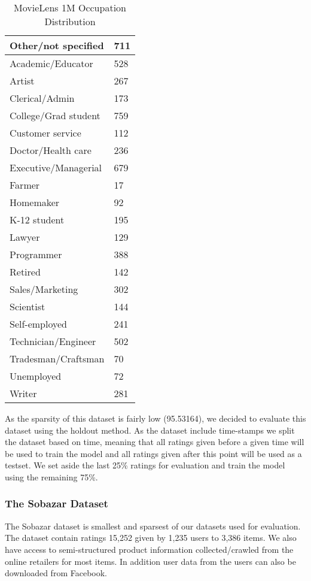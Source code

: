 \begin{table}[H]
\centering
\begin{tabular}{|l|l|}
\hline
Other/not specified  & 711  \\ \hline
Academic/Educator  & 528  \\ \hline
Artist  & 267 \\ \hline
Clerical/Admin & 173 \\ \hline
College/Grad student  & 759 \\ \hline
Customer service & 112 \\ \hline
Doctor/Health care & 236 \\ \hline
Executive/Managerial & 679 \\ \hline
Farmer & 17 \\ \hline
Homemaker & 92 \\ \hline
K-12 student & 195 \\ \hline
Lawyer & 129 \\ \hline
Programmer & 388 \\ \hline
Retired & 142 \\ \hline
Sales/Marketing & 302 \\ \hline
Scientist & 144 \\ \hline
Self-employed & 241 \\ \hline
Technician/Engineer & 502 \\ \hline
Tradesman/Craftsman & 70 \\ \hline
Unemployed & 72 \\ \hline
Writer & 281 \\ \hline
\end{tabular}
\caption{MovieLens 1M Occupation Distribution}
\end{table}

As the sparsity of this dataset is fairly low (95.53164), we decided to evaluate this dataset using the holdout method. As the dataset include time-stamps we split the dataset based on time, meaning that all ratings given before a given time will be used to train the model and all ratings given after this point will be used as a testset. We set aside the last 25\% ratings for evaluation and train the model using the remaining 75\%.

\subsubsection{The Sobazar Dataset}

The Sobazar dataset is smallest and sparsest of our datasets used for evaluation. The dataset contain ratings 15,252 given by 	1,235 users to 3,386 items. We also have access to semi-structured product information collected/crawled from the online retailers for most items. In addition user data from the users can also be downloaded from Facebook.

